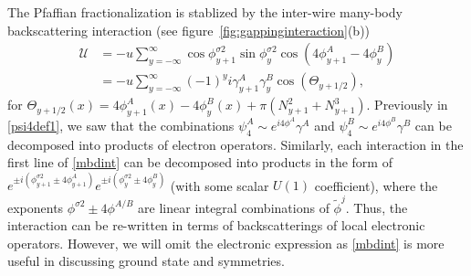 The Pfaffian fractionalization is stablized by the inter-wire many-body backscattering interaction (see figure~\ref{fig:gappinginteraction}(b)) \begin{align}\mathcal{U}&=-u\sum_{y=-\infty}^\infty\cos\phi^{\sigma2}_{y+1}\sin\phi^{\sigma2}_y\cos\left(4\phi^A_{y+1}-4\phi^B_y\right)\nonumber\\
&=-u\sum_{y=-\infty}^\infty(-1)^yi\gamma^A_{y+1}\gamma^B_y\cos\left(\Theta_{y+1/2}\right),\label{mbdint}\end{align} for $\Theta_{y+1/2}(x)=4\phi^A_{y+1}(x)-4\phi^B_y(x)+\pi(N_{y+1}^2+N_{y+1}^3)$. Previously in \eqref{psi4def1}, we saw that the combinations $\psi_4^A\sim e^{i4\phi^A}\gamma^A$ and $\psi_4^B\sim e^{i4\phi^B}\gamma^B$ can be decomposed into products of electron operators. Similarly, each interaction in the first line of \eqref{mbdint} can be decomposed into products in the form of $e^{\pm i(\phi^{\sigma2}_{y+1}\pm4\phi^A_{y+1})}e^{\pm i(\phi^{\sigma2}_y\pm4\phi^B_y)}$ (with some scalar $U(1)$ coefficient), where the exponents $\phi^{\sigma2}\pm4\phi^{A/B}$ are linear integral combinations of $\tilde\phi^j$. Thus, the interaction can be re-written in terms of backscatterings of local electronic operators. However, we will omit the electronic expression as \eqref{mbdint} is more useful in discussing ground state and symmetries. 

